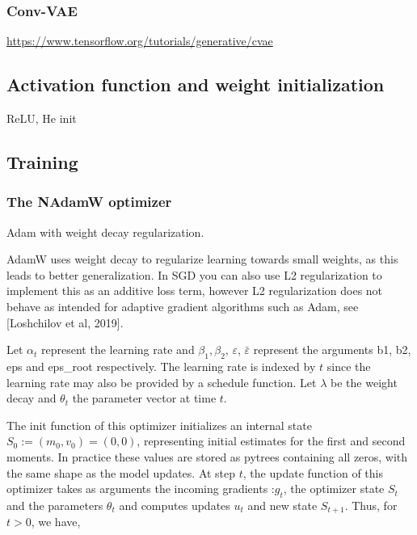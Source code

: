 \subsubsection{Conv-VAE}

\url{https://www.tensorflow.org/tutorials/generative/cvae}

\subsection{Activation function and weight initialization}

ReLU, He init

\subsection{Training}

\subsubsection{The NAdamW optimizer}


Adam with weight decay regularization.

AdamW uses weight decay to regularize learning towards small weights, as this leads to better generalization. In SGD you can also use L2 regularization to implement this as an additive loss term, however L2 regularization does not behave as intended for adaptive gradient algorithms such as Adam, see [Loshchilov et al, 2019].

Let $\alpha_t$ represent the learning rate and $\beta_1, \beta_2$,
$\varepsilon$, $\bar{\varepsilon}$  represent the arguments
b1, b2, eps and eps\_root respectively. The learning rate is
indexed by $t$ since the learning rate may also be provided by a
schedule function. Let $\lambda$ be the weight decay and 
$\theta_t$ the parameter vector at time $t$.

The init function of this optimizer initializes an internal state
$S_0 := (m_0, v_0) = (0, 0)$, representing initial estimates for the
first and second moments. In practice these values are stored as pytrees containing all zeros, with the same shape as the model updates.
At step $t$, the update function of this optimizer takes as
arguments the incoming gradients :$g_t$, the optimizer state $S_t$ 
and the parameters $\theta_t$ and computes updates $u_t$ and 
new state $S_{t+1}$. Thus, for $t > 0$, we have,

